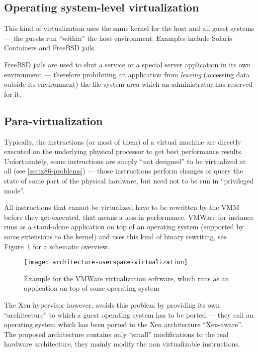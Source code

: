 \subsection{Operating system-level  virtualization}
\label{sec:oper-syst-level}

This kind  of virtualization  uses the  same kernel for  the host  and all
guest  systems  ---  the  guests  run  ``within''  the  host  environment.
Examples include Solaris Containers and FreeBSD jails.

FreeBSD jails are  used to shut a service or  a special server application
in  its own  environment  --- therefore  prohibiting  an application  from
\emph{leaving}   (\ie accessing  data   outside   its  environment)   the
file-system area which an administrator has reserved for it.

\subsection{Para-virtualization}
\label{sec:paravirtualization}

Typically, the  instructions (or  most of them)  of a virtual  machine are
directly  executed  on  the  underlying  physical processor  to  get  best
performance  results.  Unfortunately, some  instructions are  simply ``not
designed'' to be virtualized at all (see \ref{sec:x86-problems}) --- those
instructions  perform changes  or  query the  state  of some  part of  the
physical hardware, but need not to be run in ``privileged mode''.

All instructions that  cannot be virtualized have to  be rewritten by the
VMM before  they get executed, that  means a loss  in performance.  VMWare
\cite{vmware} for instance runs as  a stand-alone application on top of an
operating system  (supported by  some extensions to  the kernel)  and uses
this kind of  binary rewriting, see Figure~\ref{fig:arch-userspace-virt} for
a schematic overview.

\begin{figure}[htbp]
  \centering
  \texttt{[image: architecture-userspace-virtualization]}
  \caption[Virtualization  in  the   user-space]{Example  for  the  VMWare
    virtualization software, which  runs as an application on  top of some
    operating system}
  \label{fig:arch-userspace-virt}
\end{figure}

The Xen  hypervisor \cite{xen} however,  avoids this problem  by providing
its  own ``architecture''  to which  a guest  operating system  has  to be
ported --- they call an operating  system which has been ported to the Xen
architecture  ``Xen-aware''.   The  proposed  architecture  contains  only
``small''  modifications  to  the  real hardware  architecture,  \ie they
mainly modify the non virtualizable instructions.

